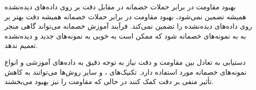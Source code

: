 \begin{qsolve}
بهبود مقاومت در برابر حملات خصمانه در مقابل دقت بر روی داده‌های دیده‌نشده همیشه تضمین نمی‌شود، بهبود مقاومت در برابر حملات خصمانه همیشه دقت بهتر بر روی داده‌های دیده‌نشده را تضمین نمی‌کند. فرآیند آموزش خصمانه می‌تواند گاهی منجر به  به نمونه‌های خصمانه شود که ممکن است به خوبی به نمونه‌های جدید و دیده‌نشده تعمیم ندهد.

دستیابی به تعادل بین مقاومت و دقت نیاز به توجه دقیق به داده‌های آموزشی و انواع نمونه‌های خصمانه مورد استفاده دارد. تکنیک‌های ،  و سایر روش‌ها می‌توانند به کاهش تأثیر منفی بر دقت کمک کنند در حالی که مقاومت را نیز بهبود می‌بخشند.

\end{qsolve}